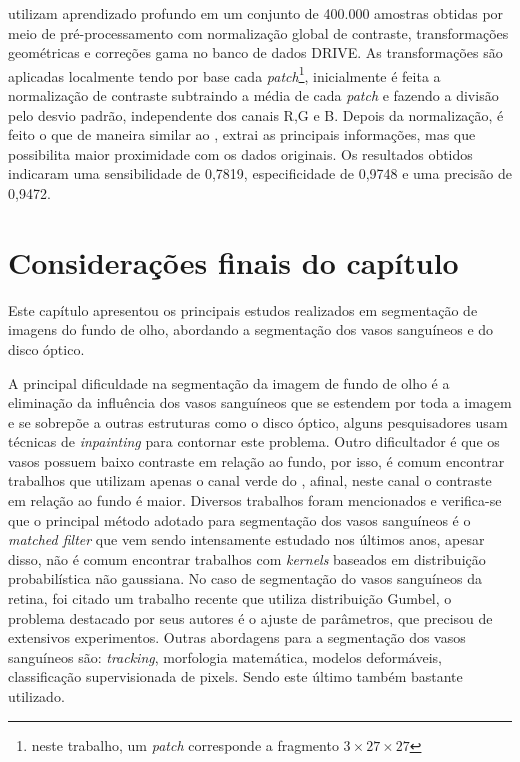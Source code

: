  utilizam aprendizado profundo em um conjunto de 400.000 amostras obtidas por meio de pré-processamento com normalização global de contraste, transformações geométricas e correções gama no banco de dados DRIVE. As transformações são aplicadas localmente tendo por base cada \textit{patch}\footnote{neste trabalho, um \textit{patch} corresponde a fragmento $3 \times 27 \times 27$ }, inicialmente é feita a normalização de contraste subtraindo a média de cada \textit{patch} e fazendo a divisão pelo desvio padrão, independente dos canais R,G e B. Depois da normalização, é feito o  que de maneira similar ao , extrai as principais informações, mas que possibilita maior proximidade com os dados originais. Os resultados obtidos indicaram uma sensibilidade de 0,7819, especificidade de 0,9748 e uma precisão de 0,9472.





\section{Considerações finais do capítulo}

Este capítulo apresentou os principais estudos realizados em segmentação de imagens do fundo de olho, abordando a segmentação dos vasos sanguíneos e do disco óptico. 


A principal dificuldade na segmentação da imagem de fundo de olho é a eliminação da influência dos vasos sanguíneos que se estendem por toda a imagem e se sobrepõe a outras estruturas como o disco óptico, alguns pesquisadores usam técnicas de \textit{inpainting} para contornar este problema. Outro dificultador é que os vasos possuem baixo contraste em relação ao fundo, por isso, é comum encontrar trabalhos que utilizam apenas o canal verde do , afinal, neste canal o contraste em relação ao fundo é maior. Diversos trabalhos foram mencionados e verifica-se que o principal método adotado para segmentação dos vasos sanguíneos é o \textit{matched filter}  que vem sendo intensamente estudado nos últimos anos, apesar disso, não é comum encontrar trabalhos com \textit{kernels} baseados em  distribuição probabilística não gaussiana. No caso de segmentação do vasos sanguíneos da retina, foi citado um trabalho recente que utiliza distribuição Gumbel, o problema destacado por seus autores é o ajuste de parâmetros, que precisou de extensivos experimentos. Outras abordagens para a segmentação dos vasos sanguíneos são: \textit{tracking}, morfologia matemática, modelos deformáveis, classificação supervisionada de pixels. Sendo este último também bastante utilizado.

